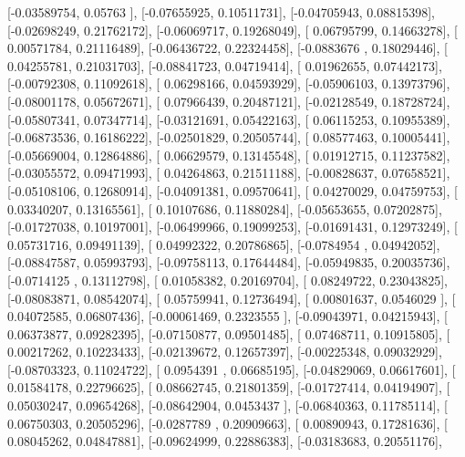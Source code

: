 \documentclass{article}
\begin{document}
       [-0.03589754,  0.05763   ],
       [-0.07655925,  0.10511731],
       [-0.04705943,  0.08815398],
       [-0.02698249,  0.21762172],
       [-0.06069717,  0.19268049],
       [ 0.06795799,  0.14663278],
       [ 0.00571784,  0.21116489],
       [-0.06436722,  0.22324458],
       [-0.0883676 ,  0.18029446],
       [ 0.04255781,  0.21031703],
       [-0.08841723,  0.04719414],
       [ 0.01962655,  0.07442173],
       [-0.00792308,  0.11092618],
       [ 0.06298166,  0.04593929],
       [-0.05906103,  0.13973796],
       [-0.08001178,  0.05672671],
       [ 0.07966439,  0.20487121],
       [-0.02128549,  0.18728724],
       [-0.05807341,  0.07347714],
       [-0.03121691,  0.05422163],
       [ 0.06115253,  0.10955389],
       [-0.06873536,  0.16186222],
       [-0.02501829,  0.20505744],
       [ 0.08577463,  0.10005441],
       [-0.05669004,  0.12864886],
       [ 0.06629579,  0.13145548],
       [ 0.01912715,  0.11237582],
       [-0.03055572,  0.09471993],
       [ 0.04264863,  0.21511188],
       [-0.00828637,  0.07658521],
       [-0.05108106,  0.12680914],
       [-0.04091381,  0.09570641],
       [ 0.04270029,  0.04759753],
       [ 0.03340207,  0.13165561],
       [ 0.10107686,  0.11880284],
       [-0.05653655,  0.07202875],
       [-0.01727038,  0.10197001],
       [-0.06499966,  0.19099253],
       [-0.01691431,  0.12973249],
       [ 0.05731716,  0.09491139],
       [ 0.04992322,  0.20786865],
       [-0.0784954 ,  0.04942052],
       [-0.08847587,  0.05993793],
       [-0.09758113,  0.17644484],
       [-0.05949835,  0.20035736],
       [-0.0714125 ,  0.13112798],
       [ 0.01058382,  0.20169704],
       [ 0.08249722,  0.23043825],
       [-0.08083871,  0.08542074],
       [ 0.05759941,  0.12736494],
       [ 0.00801637,  0.0546029 ],
       [ 0.04072585,  0.06807436],
       [-0.00061469,  0.2323555 ],
       [-0.09043971,  0.04215943],
       [ 0.06373877,  0.09282395],
       [-0.07150877,  0.09501485],
       [ 0.07468711,  0.10915805],
       [ 0.00217262,  0.10223433],
       [-0.02139672,  0.12657397],
       [-0.00225348,  0.09032929],
       [-0.08703323,  0.11024722],
       [ 0.0954391 ,  0.06685195],
       [-0.04829069,  0.06617601],
       [ 0.01584178,  0.22796625],
       [ 0.08662745,  0.21801359],
       [-0.01727414,  0.04194907],
       [ 0.05030247,  0.09654268],
       [-0.08642904,  0.0453437 ],
       [-0.06840363,  0.11785114],
       [ 0.06750303,  0.20505296],
       [-0.0287789 ,  0.20909663],
       [ 0.00890943,  0.17281636],
       [ 0.08045262,  0.04847881],
       [-0.09624999,  0.22886383],
       [-0.03183683,  0.20551176],
\end{document}
